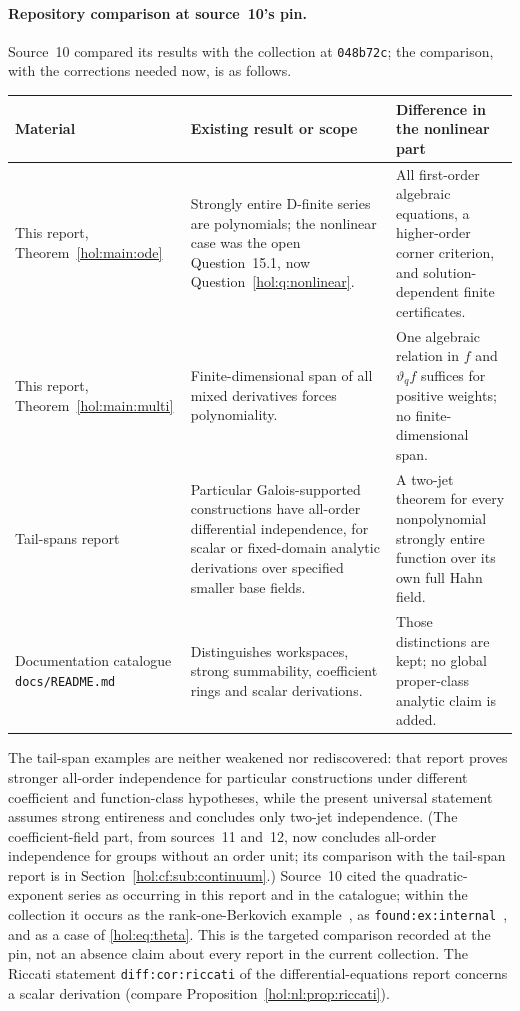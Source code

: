 \documentclass[11pt]{article}
\numberwithin{equation}{section}
\theoremstyle{definition}
\theoremstyle{remark}
\begin{document}
\paragraph{Repository comparison at source~10's pin.}
Source~10 compared its results with the collection at
\texttt{048b72c}; the comparison, with the corrections needed now, is as
follows.
\begin{center}
\small
\begin{tabularx}{\textwidth}{@{}>{\raggedright\arraybackslash}p{}
>{\raggedright\arraybackslash}X>{\raggedright\arraybackslash}X@{}}
\toprule
Material & Existing result or scope & Difference in the nonlinear part\\
\midrule
This report, Theorem~\ref{hol:main:ode} & Strongly entire D-finite series are
polynomials; the nonlinear case was the open Question~15.1, now
Question~\ref{hol:q:nonlinear}. & All first-order algebraic equations, a
higher-order corner criterion, and solution-dependent finite certificates.\\
This report, Theorem~\ref{hol:main:multi} & Finite-dimensional span of all
mixed derivatives forces polynomiality. & One algebraic relation in $f$ and
$\vartheta_qf$ suffices for positive weights; no finite-dimensional span.\\
Tail-spans report~\cite{repotail} & Particular Galois-supported constructions
have all-order differential independence, for scalar or fixed-domain analytic
derivations over specified smaller base fields. & A two-jet theorem for every
nonpolynomial strongly entire function over its own full Hahn field.\\
Documentation catalogue \texttt{docs/README.md} & Distinguishes workspaces, strong
summability, coefficient rings and scalar derivations. & Those distinctions
are kept; no global proper-class analytic claim is added.\\
\bottomrule
\end{tabularx}
\end{center}
The tail-span examples are neither weakened nor rediscovered: that report
proves stronger all-order independence for particular constructions under
different coefficient and function-class hypotheses, while the present
universal statement assumes strong entireness and concludes only two-jet
independence. (The coefficient-field part, from sources~11 and~12, now
concludes all-order independence for groups without an order unit; its
comparison with the tail-span report is in
Section~\ref{hol:cf:sub:continuum}.) Source~10 cited the quadratic-exponent series as occurring in
this report and in the catalogue; within the collection it occurs as the
rank-one-Berkovich example~\cite{reporankone}, as
\texttt{found:ex:internal}~\cite{repofoundations}, and as a case of
\eqref{hol:eq:theta}. This is the targeted comparison recorded at the pin,
not an absence claim about every report in the current collection. The
Riccati statement \texttt{diff:cor:riccati} of the
differential-equations report concerns a scalar derivation (compare
Proposition~\ref{hol:nl:prop:riccati}).
\end{document}

